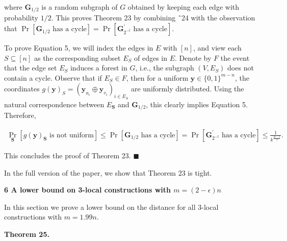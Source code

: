 \documentclass[10pt,a4paper]{article}
\begin{document}
where $\boldsymbol{G}_{1/2}$ is a random subgraph of $G$ obtained by keeping each edge with probability $1/2$.
This proves Theorem 23 by combining ˜24 with the observation that $\Pr[\text{$\boldsymbol{G}_{1/2}$ has a cycle}]=\Pr[\text{$\boldsymbol{G}^{\prime}_{2^{-t}}$ has a cycle}]$.\par




To prove Equation 5, we will index the edges in $E$ with $[n]$, and view each $S\subseteq[n]$ as the corresponding subset $E_{S}$ of edges in $E$.
Denote by $F$ the event that the edge set $E_{S}$ induces a forest in $G$, i.e., the subgraph $(V,E_{S})$ does not contain a cycle.
Observe that if $E_{S}\in F$, then for a uniform $\boldsymbol{y}\in\{0,1\}^{m-n}$, the coordinates $g(\boldsymbol{y})_{S}=(\boldsymbol{y}_{u_{i}}\oplus\boldsymbol{y}_{v_{i}})_{i\in E_{S}}$ are uniformly distributed.
Using the natural correspondence between $E_{\boldsymbol{S}}$ and $\boldsymbol{G}_{1/2}$, this clearly implies Equation 5.
Therefore,\par


\[\begin{gathered}
\displaystyle\Pr_{\boldsymbol{S}}[\text{$g(\boldsymbol{y})_{\boldsymbol{S}}$ is not uniform}]\leq\Pr[\text{$\boldsymbol{G}_{1/2}$ has a cycle}]=\Pr[\text{$\boldsymbol{G}^{\prime}_{2^{-t}}$ has a cycle}]\leq\frac{1}{k^{\frac{2t-5}{3}}}.
\end{gathered}\]


This concludes the proof of Theorem 23. \ensuremath{\blacksquare}\par




In the full version of the paper, we show that Theorem 23 is tight.\par







\par\medskip\noindent\textbf{
6 A lower bound on 3-local constructions with $m=(2-\epsilon)n$
}\par




In this section we prove a lower bound on the distance for all 3-local constructions with $m=1.99n$.\par





\par\medskip\noindent\textbf{
\textbf{Theorem 25}\textbf{.}
}\par
\end{document}
